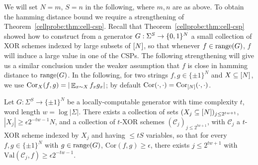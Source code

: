 We will set $N=m$, $S=n$ in the following, where $m,n$ are as above. To obtain the hamming distance bound we require a strengthening of Theorem~\ref{cellprobe:thm:cell-csp}. Recall that Theorem~\ref{cellprobe:thm:cell-csp} showed how to construct from a generator $G:\Sigma^S \to \{0,1\}^N$ a small collection of XOR schemes indexed by large subsets of $[N]$, so that whenever $f \in \mathrm{range}(G)$, $f$ will induce a large value in one of the CSPs. The following strengthening will give us a similar conclusion under the weaker assumption that $f$ is close in hamming distance to $\mathrm{range}(G)$. In the following, for two strings $f,g\in \{\pm 1\}^N$ and $X \subseteq [N]$, we use $\mathrm{Cor}_X(f,g) = |\mathop{\mathbb{E}}_{x \sim X} f_x g_x|$; by default $\mathrm{Cor}(\cdot,\cdot)=\mathrm{Cor}_{[N]}(\cdot, \cdot)$. 
\begin{theorem}\label{cellprobe:thm:cell-csp-correlation}
Let $G: \Sigma^S \to \{\pm 1\}^{N}$ be a locally-computable generator with time complexity $t$, word length $w= \log |\Sigma|$. There exists a collection of sets $(X_j \subseteq [N])_{j \leq 2^{tw + 1}}$, $|X_j| \geq \epsilon2^{-tw-1}N$, and a collection of $t$-XOR schemes $(\mathcal{C}_j)_{j \leq 2^{tw + 1}}$, with $\mathcal{C}_j$ a $t$-XOR scheme indexed by $X_j$ and having $\leq tS$ variables, so that for every $f,g\in \{\pm 1\}^N$ with $g\in \mathrm{range}(G)$, $\mathrm{Cor}(f,g) \geq \epsilon$, there exists $j \leq 2^{tw + 1}$ with $\mathrm{Val}(\mathcal{C}_j,f) \geq \epsilon2^{-tw-1}$.
\end{theorem}
